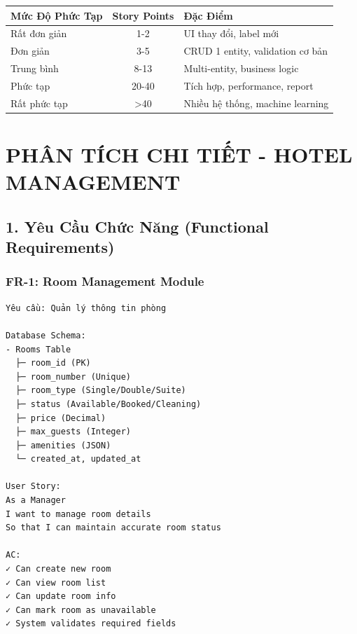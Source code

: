 \documentclass[12pt, a4paper]{report}
\begin{document}
\begin{table}[h]
\centering
\begin{tabular}{|l|c|p{4cm}|}
\hline
\textbf{Mức Độ Phức Tạp} & \textbf{Story Points} & \textbf{Đặc Điểm} \\
\hline
Rất đơn giản & 1-2 & UI thay đổi, label mới \\
\hline
Đơn giản & 3-5 & CRUD 1 entity, validation cơ bản \\
\hline
Trung bình & 8-13 & Multi-entity, business logic \\
\hline
Phức tạp & 20-40 & Tích hợp, performance, report \\
\hline
Rất phức tạp & >40 & Nhiều hệ thống, machine learning \\
\hline
\end{tabular}
\end{table}

\newpage

\chapter{PHÂN TÍCH CHI TIẾT - HOTEL MANAGEMENT}

\section{1. Yêu Cầu Chức Năng (Functional Requirements)}

\subsection{FR-1: Room Management Module}

\begin{tcolorbox}[colback=green!5]
\begin{lstlisting}
Yêu cầu: Quản lý thông tin phòng

Database Schema:
- Rooms Table
  ├─ room_id (PK)
  ├─ room_number (Unique)
  ├─ room_type (Single/Double/Suite)
  ├─ status (Available/Booked/Cleaning)
  ├─ price (Decimal)
  ├─ max_guests (Integer)
  ├─ amenities (JSON)
  └─ created_at, updated_at

User Story:
As a Manager
I want to manage room details
So that I can maintain accurate room status

AC:
✓ Can create new room
✓ Can view room list
✓ Can update room info
✓ Can mark room as unavailable
✓ System validates required fields
\end{lstlisting}
\end{tcolorbox}
\end{document}
